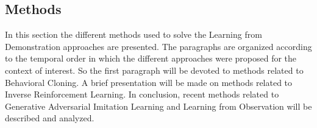 \subsection{Methods}
In this section the different methods used to solve the Learning from Demonstration approaches are presented. The paragraphs are organized according to the temporal order in which the different approaches were proposed for the context of interest. So the first paragraph will be devoted to methods related to Behavioral Cloning. A brief presentation will be made on methods related to Inverse Reinforcement Learning. In conclusion, recent methods related to Generative Adversarial Imitation Learning and Learning from Observation will be described and analyzed.
\label{sec:methods}



